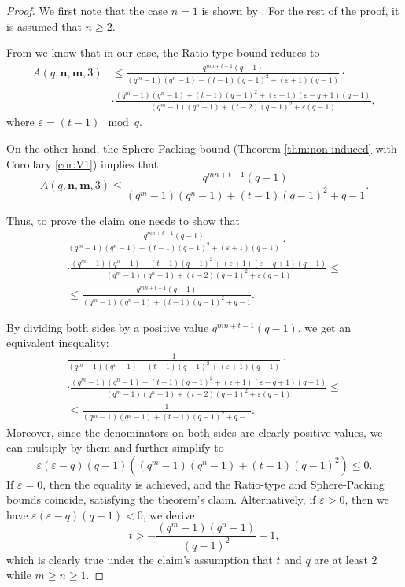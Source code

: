 \documentclass[a4paper]{article}
\newcommand{\bfn}{\mathbf {n}}
\newcommand{\bfm}{\mathbf {m}}
\begin{document}
\begin{proof}
    We first note that the case $n=1$ is shown by \cite[Lemma 25]{AKR2024}. For the rest of the proof, it is assumed that $n\geq 2$.
    
    From \cite[Theorem 24]{AKR2024} we know that in our case, the Ratio-type bound reduces to
    \begin{align*}
        A(q,\bfn,\bfm,3)&\leq\frac{q^{mn+t-1}(q-1)}{(q^m-1)(q^n-1)+(t-1)(q-1)^2+(\varepsilon+1)(q-1)}\cdot \\
        &\cdot\frac{(q^m-1)(q^n-1)+(t-1)(q-1)^2+(\varepsilon+1)(\varepsilon-q+1)(q-1)}{(q^m-1)(q^n-1)+(t-2)(q-1)^2+\varepsilon(q-1)},
    \end{align*}
    where $\varepsilon=(t-1)\mod q$.

    On the other hand, the Sphere-Packing bound (Theorem \ref{thm:non-induced} with Corollary \ref{cor:V1}) implies that
    $$A(q,\bfn,\bfm,3)\leq\frac{q^{mn+t-1}(q-1)}{(q^m-1)(q^n-1)+(t-1)(q-1)^2+q-1}.$$

    Thus, to prove the claim one needs to show that
    \begin{multline*}
        \frac{q^{mn+t-1}(q-1)}{(q^m-1)(q^n-1)+(t-1)(q-1)^2+(\varepsilon+1)(q-1)} \cdot \\
        \cdot\frac{(q^m-1)(q^n-1)+(t-1)(q-1)^2+(\varepsilon+1)(\varepsilon-q+1)(q-1)}{(q^m-1)(q^n-1)+(t-2)(q-1)^2+\varepsilon(q-1)} \leq\\
        \leq\frac{q^{mn+t-1}(q-1)}{(q^m-1)(q^n-1)+(t-1)(q-1)^2+q-1}.
    \end{multline*}

    By dividing both sides by a positive value $q^{mn+t-1}(q-1)$, we get an equivalent inequality:
    \begin{multline*}
        \frac{1}{(q^m-1)(q^n-1)+(t-1)(q-1)^2+(\varepsilon+1)(q-1)} \cdot \\
        \cdot\frac{(q^m-1)(q^n-1)+(t-1)(q-1)^2+(\varepsilon+1)(\varepsilon-q+1)(q-1)}{(q^m-1)(q^n-1)+(t-2)(q-1)^2+\varepsilon(q-1)} \leq\\
        \leq\frac{1}{(q^m-1)(q^n-1)+(t-1)(q-1)^2+q-1}.
    \end{multline*}
    Moreover, since the denominators on both sides are clearly positive values, we can multiply by them and further simplify to
    $$\varepsilon (\varepsilon - q) (q-1) \left((q^m-1)(q^n-1) + (t-1)(q-1)^2\right) \leq 0.$$
    If $\varepsilon=0$, then the equality is achieved, and the Ratio-type and Sphere-Packing bounds coincide, satisfying the theorem's claim. Alternatively, if $\varepsilon>0$, then we have $\varepsilon (\varepsilon - q) (q-1)<0$, we derive
    $$t > -\frac{(q^m-1)(q^n-1)}{(q-1)^2}+1,$$
    which is clearly true under the claim's assumption that $t$ and $q$ are at least $2$ while $m\geq n\geq 1$.
\end{proof}
\end{document}
